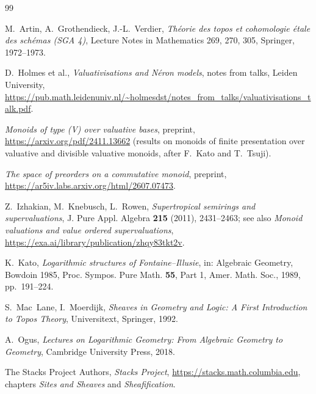 \documentclass[11pt]{amsart}
\theoremstyle{plain}
\theoremstyle{remark}
\theoremstyle{definition}
\numberwithin{equation}{section}
\begin{document}
\begin{thebibliography}{99}

M.~Artin, A.~Grothendieck, J.-L.~Verdier, \emph{Th\'eorie des topos et
cohomologie \'etale des sch\'emas (SGA 4)}, Lecture Notes in Mathematics
269, 270, 305, Springer, 1972--1973.

D.~Holmes et al., \emph{Valuativisations and N\'eron models}, notes from
talks, Leiden University,
\url{https://pub.math.leidenuniv.nl/~holmesdst/notes_from_talks/valuativisations_talk.pdf}.

\emph{Monoids of type (V) over valuative bases}, preprint,
\url{https://arxiv.org/pdf/2411.13662} (results on monoids of finite
presentation over valuative and divisible valuative monoids, after
F.~Kato and T.~Tsuji).

\emph{The space of preorders on a commutative monoid}, preprint,
\url{https://ar5iv.labs.arxiv.org/html/2607.07473}.

Z.~Izhakian, M.~Knebusch, L.~Rowen, \emph{Supertropical semirings and
supervaluations}, J. Pure Appl. Algebra \textbf{215} (2011), 2431--2463;
see also \emph{Monoid valuations and value ordered supervaluations},
\url{https://exa.ai/library/publication/zhqy83tkt2v}.

K.~Kato, \emph{Logarithmic structures of Fontaine--Illusie}, in:
Algebraic Geometry, Bowdoin 1985, Proc. Sympos. Pure Math.
\textbf{55}, Part 1, Amer. Math. Soc., 1989, pp.~191--224.

S.~Mac~Lane, I.~Moerdijk, \emph{Sheaves in Geometry and Logic: A First
Introduction to Topos Theory}, Universitext, Springer, 1992.

A.~Ogus, \emph{Lectures on Logarithmic Geometry: From Algebraic Geometry
to Geometry}, Cambridge University Press, 2018.

The Stacks Project Authors, \emph{Stacks Project},
\url{https://stacks.math.columbia.edu}, chapters \emph{Sites and Sheaves}
and \emph{Sheafification}.

\end{thebibliography}
\end{document}
